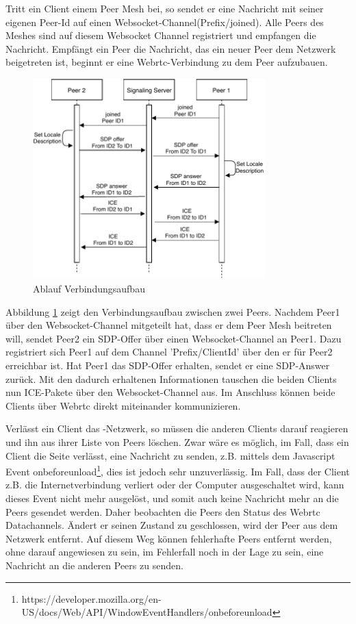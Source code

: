 Tritt ein Client einem Peer Mesh bei, so sendet er eine Nachricht mit seiner eigenen Peer-Id auf einen Websocket-Channel({Prefix}/joined). Alle Peers des Meshes sind auf diesem Websocket Channel registriert und empfangen die Nachricht. Empfängt ein Peer die Nachricht, das ein neuer Peer dem Netzwerk beigetreten ist, beginnt er eine Webrtc-Verbindung zu dem Peer aufzubauen.

\begin{figure}[!h]
	\centering
	\includegraphics[width=0.8\textwidth]{figures/Signaling-Webrtc}
	\caption[A Figure Short-Title]{Ablauf Verbindungsaufbau}
	\label{fig:signaling-connection}
\end{figure}

Abbildung \ref{fig:signaling-connection} zeigt den Verbindungsaufbau zwischen zwei Peers. Nachdem Peer1 über den Websocket-Channel mitgeteilt hat, dass er dem Peer Mesh beitreten will, sendet Peer2 ein SDP-Offer über einen Websocket-Channel an Peer1. Dazu registriert sich Peer1 auf dem Channel '{Prefix}/{ClientId}' über den er für Peer2 erreichbar ist. Hat Peer1 das SDP-Offer erhalten, sendet er eine SDP-Answer zurück. Mit den dadurch erhaltenen Informationen tauschen die beiden Clients nun ICE-Pakete über den Websocket-Channel aus. Im Anschluss können beide Clients über Webrtc direkt miteinander kommunizieren.

Verlässt ein Client das \pTp-Netzwerk, so müssen die anderen Clients darauf reagieren und ihn aus ihrer Liste von Peers löschen. Zwar wäre es möglich, im Fall, dass ein Client die Seite verlässt, eine Nachricht zu senden, z.B. mittels dem Javascript Event onbeforeunload\footnote{https://developer.mozilla.org/en-US/docs/Web/API/WindowEventHandlers/onbeforeunload}, dies ist jedoch sehr unzuverlässig. Im Fall, dass der Client z.B. die Internetverbindung verliert oder der Computer ausgeschaltet wird, kann dieses Event nicht mehr ausgelöst, und somit auch keine Nachricht mehr an die Peers gesendet werden. Daher beobachten die Peers den Status des Webrtc Datachannels. Ändert er seinen Zustand zu geschlossen, wird der Peer aus dem Netzwerk entfernt. Auf diesem Weg können fehlerhafte Peers entfernt werden, ohne darauf angewiesen zu sein, im Fehlerfall noch in der Lage zu sein, eine Nachricht an die anderen Peers zu senden.

